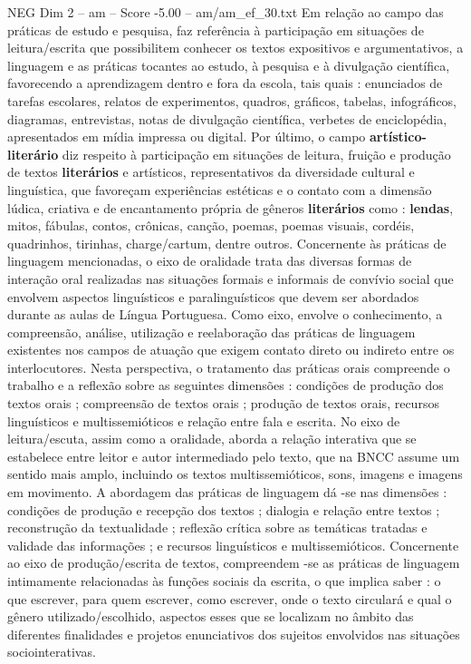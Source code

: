 \begin{textsample}{NEG Dim 2 – am – Score -5.00 – am/am\_ef\_30.txt}
Em relação ao campo das práticas de estudo e pesquisa, faz referência à participação em situações de leitura/escrita que possibilitem conhecer os textos expositivos e argumentativos, a linguagem e as práticas tocantes ao estudo, à pesquisa e à divulgação científica, favorecendo a aprendizagem dentro e fora da escola, tais quais : enunciados de tarefas escolares, relatos de experimentos, quadros, gráficos, tabelas, infográficos, diagramas, entrevistas, notas de divulgação científica, verbetes de enciclopédia, apresentados em mídia impressa ou digital.
Por último, o campo \textbf{artístico-literário} diz respeito à participação em situações de leitura, fruição e produção de textos \textbf{literários} e artísticos, representativos da diversidade cultural e linguística, que favoreçam experiências estéticas e o contato com a dimensão lúdica, criativa e de encantamento própria de gêneros \textbf{literários} como : \textbf{lendas}, mitos, fábulas, contos, crônicas, canção, poemas, poemas visuais, cordéis, quadrinhos, tirinhas, charge/cartum, dentre outros.
Concernente às práticas de linguagem mencionadas, o eixo de oralidade trata das diversas formas de interação oral realizadas nas situações formais e informais de convívio social que envolvem aspectos linguísticos e paralinguísticos que devem ser abordados durante as aulas de Língua Portuguesa.
Como eixo, envolve o conhecimento, a compreensão, análise, utilização e reelaboração das práticas de linguagem existentes nos campos de atuação que exigem contato direto ou indireto entre os interlocutores.
Nesta perspectiva, o tratamento das práticas orais compreende o trabalho e a reflexão sobre as seguintes dimensões : condições de produção dos textos orais ; compreensão de textos orais ; produção de textos orais, recursos linguísticos e multissemióticos e relação entre fala e escrita.
No eixo de leitura/escuta, assim como a oralidade, aborda a relação interativa que se estabelece entre leitor e autor intermediado pelo texto, que na BNCC assume um sentido mais amplo, incluindo os textos multissemióticos, sons, imagens e imagens em movimento.
A abordagem das práticas de linguagem dá -se nas dimensões : condições de produção e recepção dos textos ; dialogia e relação entre textos ; reconstrução da textualidade ; reflexão crítica sobre as temáticas tratadas e validade das informações ; e recursos linguísticos e multissemióticos.
Concernente ao eixo de produção/escrita de textos, compreendem -se as práticas de linguagem intimamente relacionadas às funções sociais da escrita, o que implica saber : o que escrever, para quem escrever, como escrever, onde o texto circulará e qual o gênero utilizado/escolhido, aspectos esses que se localizam no âmbito das diferentes finalidades e projetos enunciativos dos sujeitos envolvidos nas situações sociointerativas.

\end{textsample}
